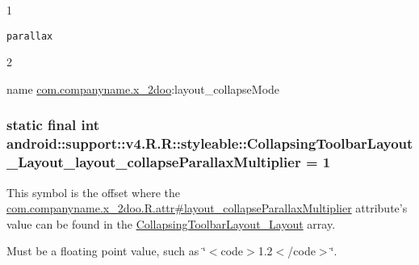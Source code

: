 1

{\tt parallax}

2

name \hyperlink{namespacecom_1_1companyname_1_1x__2doo}{com.companyname.x\_\-2doo}:layout\_\-collapseMode \hypertarget{classandroid_1_1support_1_1v4_1_1_r_1_1styleable_d364fcfe501be0099ffef1f05abd61c9}{
\subsubsection[{CollapsingToolbarLayout\_\-Layout\_\-layout\_\-collapseParallaxMultiplier}]{\setlength{\rightskip}{0pt plus 5cm}static final int android::support::v4.R.R::styleable::CollapsingToolbarLayout\_\-Layout\_\-layout\_\-collapseParallaxMultiplier = 1}}
\label{classandroid_1_1support_1_1v4_1_1_r_1_1styleable_d364fcfe501be0099ffef1f05abd61c9}


This symbol is the offset where the \hyperlink{classcom_1_1companyname_1_1x__2doo_1_1_r_1_1attr_7c76470a91344ee8f21464e64bcabc7f}{com.companyname.x\_\-2doo.R.attr\#layout\_\-collapseParallaxMultiplier} attribute's value can be found in the \hyperlink{classandroid_1_1support_1_1v4_1_1_r_1_1styleable_6906c73a21feed9a1c451f787d6f3059}{CollapsingToolbarLayout\_\-Layout} array.

Must be a floating point value, such as \char`\"{}$<$code$>$1.2$<$/code$>$\char`\"{}. 

